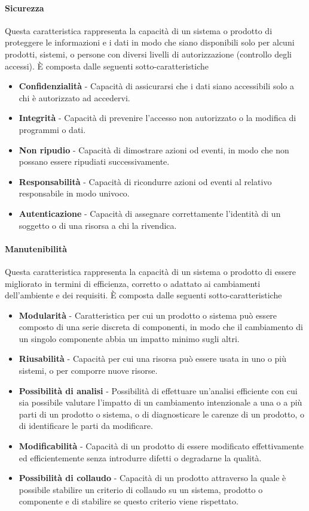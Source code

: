 \paragraph{Sicurezza}
Questa caratteristica rappresenta la capacità di un sistema o prodotto di proteggere le informazioni e i dati in modo che siano disponibili solo per alcuni prodotti, sistemi, o persone con diversi livelli di autorizzazione (controllo degli accessi).
È composta dalle seguenti sotto-caratteristiche
\begin{itemize}
\item \textbf{Confidenzialità} - Capacità di assicurarsi che i dati siano accessibili solo a chi è autorizzato ad accedervi.
\item \textbf{Integrità} - Capacità di prevenire l'accesso non autorizzato o la modifica di programmi o dati.
\item \textbf{Non ripudio} - Capacità di dimostrare azioni od eventi, in modo che non possano essere ripudiati successivamente.
\item \textbf{Responsabilità} - Capacità di ricondurre azioni od eventi al relativo responsabile in modo univoco.
\item \textbf{Autenticazione} - Capacità di assegnare correttamente l'identità di un soggetto o di una risorsa a chi la rivendica.
\end{itemize}


\paragraph{Manutenibilità}
Questa caratteristica rappresenta la capacità di un sistema o prodotto di essere migliorato in termini di efficienza, corretto o adattato ai cambiamenti dell'ambiente e dei requisiti.
È composta dalle seguenti sotto-caratteristiche
\begin{itemize}
\item \textbf{Modularità} - Caratteristica per cui un prodotto o sistema può essere composto di una serie discreta di componenti, in modo che il cambiamento di un singolo componente abbia un impatto minimo sugli altri. 
\item \textbf{Riusabilità} - Capacità per cui una risorsa può essere usata in uno o più sistemi, o per comporre nuove risorse.
\item \textbf{Possibilità di analisi} - Possibilità di effettuare un'analisi efficiente con cui sia possibile valutare l'impatto di un cambiamento intenzionale a una o a più parti di un prodotto o sistema, o di diagnosticare le carenze di un prodotto, o di identificare le parti da modificare.
\item \textbf{Modificabilità} - Capacità di un prodotto di essere modificato effettivamente ed efficientemente senza introdurre difetti o degradarne la qualità.
\item \textbf{Possibilità di collaudo} - Capacità di un prodotto attraverso la quale è possibile stabilire un criterio di collaudo su un sistema, prodotto o componente e di stabilire se questo criterio viene rispettato.
\end{itemize}
